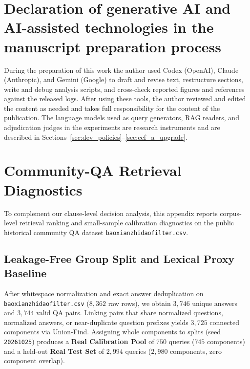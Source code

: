\documentclass[10pt,twocolumn]{article}
\renewcommand{\_}{\textunderscore\allowbreak}
\begin{document}
\section*{Declaration of generative AI and AI-assisted technologies in the manuscript preparation process}
During the preparation of this work the author used Codex (OpenAI), Claude (Anthropic), and Gemini (Google) to draft and revise text, restructure sections, write and debug analysis scripts, and cross-check reported figures and references against the released logs. After using these tools, the author reviewed and edited the content as needed and takes full responsibility for the content of the publication. The language models used as query generators, RAG readers, and adjudication judges in the experiments are research instruments and are described in Sections~\ref{sec:dev_policies}--\ref{sec:ccf_a_upgrade}.

\appendix
\section{Community-QA Retrieval Diagnostics}
\label{app:retrieval}

To complement our clause-level decision analysis, this appendix reports corpus-level retrieval ranking and small-sample calibration diagnostics on the public historical community QA dataset \texttt{baoxianzhidao\_filter.csv}.

\subsection{Leakage-Free Group Split and Lexical Proxy Baseline}
After whitespace normalization and exact answer deduplication on \texttt{baoxianzhidao\_filter.csv} ($8{,}362$ raw rows), we obtain $3{,}746$ unique answers and $3{,}744$ valid QA pairs. Linking pairs that share normalized questions, normalized answers, or near-duplicate question prefixes yields $3{,}725$ connected components via Union-Find. Assigning whole components to splits (seed \texttt{20261025}) produces a \textbf{Real Calibration Pool} of $750$ queries ($745$ components) and a held-out \textbf{Real Test Set} of $2{,}994$ queries ($2{,}980$ components, zero component overlap).
\end{document}
